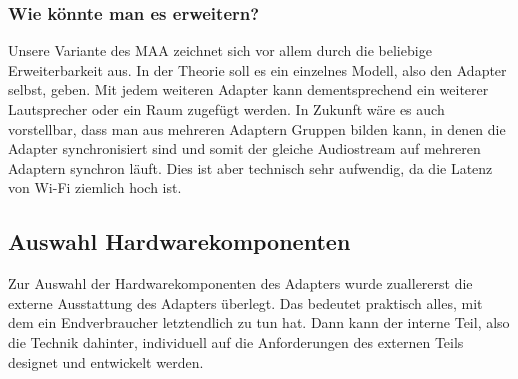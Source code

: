 \documentclass[11pt, twoside]{article}
\begin{document}
\subsubsection{Wie könnte man es erweitern?}
Unsere Variante des MAA zeichnet sich vor allem durch die beliebige Erweiterbarkeit aus. In der Theorie soll es ein einzelnes Modell, also den Adapter selbst, geben. Mit jedem weiteren Adapter kann dementsprechend ein weiterer Lautsprecher oder ein Raum zugefügt werden. In Zukunft wäre es auch vorstellbar, dass man aus mehreren Adaptern Gruppen bilden kann, in denen die Adapter synchronisiert sind und somit der gleiche Audiostream auf mehreren Adaptern synchron läuft. Dies ist aber technisch sehr aufwendig, da die Latenz von Wi-Fi ziemlich hoch ist.
\subsection{Auswahl Hardwarekomponenten}
Zur Auswahl der Hardwarekomponenten des Adapters wurde zuallererst die externe Ausstattung des Adapters überlegt. Das bedeutet praktisch alles, mit dem ein Endverbraucher letztendlich zu tun hat. Dann kann der interne Teil, also die Technik dahinter, individuell auf die Anforderungen des externen Teils designet und entwickelt werden.
\end{document}
